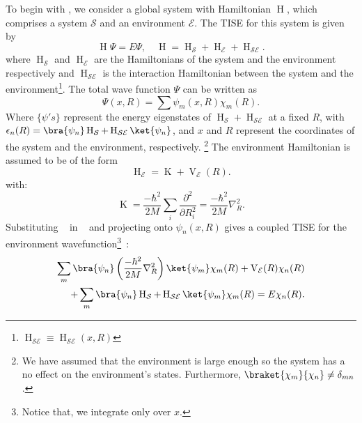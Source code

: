 To begin with , we consider a global system with Hamiltonian $\operatorname{H}$, which comprises a system $\mathcal{S}$ and an environment $\mathcal{E}$. 
The TISE for this system is given by
\begin{equation}
\label{eqn:chap2_TISE}
\operatorname{H}\Psi = E\Psi, \quad \operatorname{H} = \operatorname{H}_\mathcal{S} + \operatorname{H}_{\mathcal{E}} + \operatorname{H}_{\mathcal{SE}}.
\end{equation}
where $\operatorname{H}_\mathcal{S}$ and $\operatorname{H}_{\mathcal{E}}$ are the Hamiltonians of the system 
and the environment respectively and $\operatorname{H}_{\mathcal{SE}}$ is the interaction
Hamiltonian between the system and the environment\footnote{$\operatorname{H}_{\mathcal{SE}}\equiv \operatorname{H}_{\mathcal{SE}}(x, R)$}.
The total wave function $\Psi$ can be written as
\begin{equation}
    \label{eqn:chap2_total_wavefunction}
    \Psi(x, R) = \sum  \psi_m (x, R) \chi_m(R).
\end{equation}
Where \(\{\psi 's\}\) represent the energy eigenstates of \(\operatorname{H}_{\mathcal{S}} + \operatorname{H}_{\mathcal{SE}}\) at a fixed $R$, with \\ \(\epsilon_n (R) =  \bra{\psi_n}\operatorname{H}_{\mathcal{S}} + \operatorname{H}_{\mathcal{SE}}\ket{\psi_n}\), and $x$ and $R$ represent the coordinates of the system and the environment, respectively.
\footnote{We have assumed that the environment is large enough so the system  has a 
no effect on the environment's states. Furthermore, \(\braket{\chi_m}{\chi_n} \not = \delta_{mn}\).}
The environment Hamiltonian is assumed to be of the form
\begin{equation}
    \label{eqn:chap2_env_hamiltonian}
    \operatorname{H}_{\mathcal{E}} = \operatorname{K} + \operatorname{V}_{\mathcal{E}} (R).
\end{equation}
with:
\begin{equation}
    \operatorname{K} = \frac{-\hbar^2}{2M} \sum_i \frac{\partial^2}{\partial R_i^2} = \frac{-\hbar^2}{2M} 
    \nabla _R^2.
\end{equation}
Substituting ~ in ~ and projecting onto
$\psi_n(x, R)$ gives a coupled TISE for the environment wavefunction\footnote{Notice 
that, we integrate only over $x$.}~\cite{briggs2001derivation}:
\begin{equation}
    \label{eqn:briggs_rost_eq5}
    \begin{aligned}
        \sum_{m} \bra{\psi_n} \left(\frac{-\hbar^2}{2M} \nabla_R^2 \right) \ket{\psi_m} \chi_m(R) 
    + \operatorname{V}_{\mathcal{E}}(R) \chi_n(R)\\
    + \sum_{m} \bra{\psi_n} \operatorname{H}_{\mathcal{S}} + \operatorname{H}_{\mathcal{SE}}\ket{\psi_m}\chi_m(R) = E \chi_n(R).
    \end{aligned}
\end{equation}
